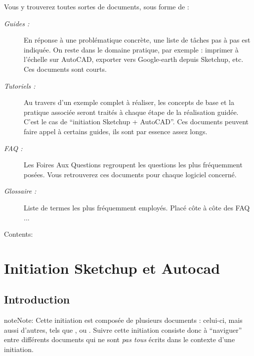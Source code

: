 \documentclass[a4paper,12pt,french]{sphinxmanual}
\begin{document}
Vous y trouverez toutes sortes de documents, sous forme de :
\begin{description}
\item[{\emph{Guides :}}] \leavevmode
En réponse à une problématique concrète, une liste de tâches pas à pas est indiquée. On reste dans le domaine pratique, par exemple : imprimer à l'échelle sur AutoCAD, exporter vers Google-earth depuis Sketchup, etc. Ces documents sont courts.

\item[{\emph{Tutoriels :}}] \leavevmode
Au travers d'un exemple complet à réaliser, les concepts de base et la pratique associée seront traités à chaque étape de la réalisation guidée. C'est le cas de ``initiation Sketchup + AutoCAD''. Ces documents peuvent faire appel à certains guides, ils sont par essence assez longs.

\item[{\emph{FAQ :}}] \leavevmode
Les Foires Aux Questions regroupent les questions les plus fréquemment posées. Vous retrouverez ces documents pour chaque logiciel concerné.

\item[{\emph{Glossaire :}}] \leavevmode
Liste de termes les plus fréquemment employés. Placé côte à côte des FAQ ...

\end{description}

Contents:


\chapter{Initiation Sketchup et Autocad}
\label{init_su+acad/index:initiation-sketchup-et-autocad}\label{init_su+acad/index:index-init-su-acad}\label{init_su+acad/index::doc}\label{init_su+acad/index:documentation-canopee}

\section{Introduction}
\label{init_su+acad/intro:introduction}\label{init_su+acad/intro::doc}
\begin{notice}{note}{Note:}
Cette initiation est composée de plusieurs documents : celui-ci, mais aussi d'autres, tels que {\hyperref[su/config\string-su::doc]{}}, ou {\hyperref[acad/config_acad::doc]{}} . Suivre cette initiation consiste donc à ``naviguer'' entre différents documents qui ne sont \emph{pas tous} écrits dans le contexte d'une initiation.
\end{notice}
\end{document}
